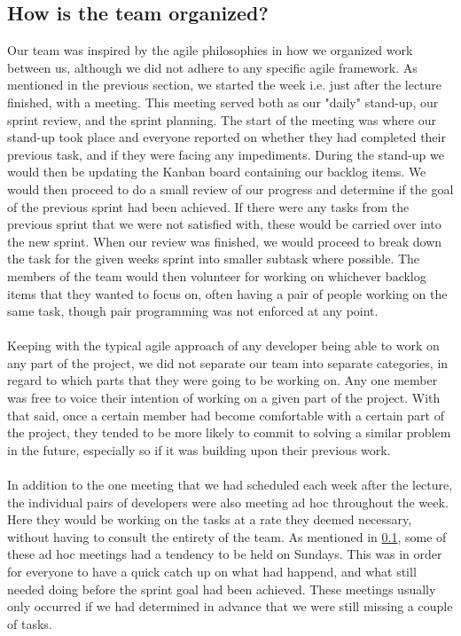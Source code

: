 \subsection{How is the team organized?} \label{Team organization}
Our team was inspired by the agile philosophies in how we organized work between us, although we did not adhere to any specific agile framework. As mentioned in the previous section, we started the week i.e. just after the lecture finished, with a meeting. This meeting served both as our "daily" stand-up, our sprint review, and the sprint planning. The start of the meeting was where our stand-up took place and everyone reported on whether they had completed their previous task, and if they were facing any impediments. During the stand-up we would then be updating the Kanban board containing our backlog items. We would then proceed to do a small review of our progress and determine if the goal of the previous sprint had been achieved. If there were any tasks from the previous sprint that we were not satisfied with, these would be carried over into the new sprint. When our review was finished, we would proceed to break down the task for the given weeks sprint into smaller subtask where possible. The members of the team would then volunteer for working on whichever backlog items that they wanted to focus on, often having a pair of people working on the same task, though pair programming was not enforced at any point.
\\\\
Keeping with the typical agile approach of any developer being able to work on any part of the project, we did not separate our team into separate categories, in regard to which parts that they were going to be working on. Any one member was free to voice their intention of working on a given part of the project. With that said, once a certain member had become comfortable  with a certain part of the project, they tended to be more likely to commit to solving a similar problem in the future, especially so if it was building upon their previous work.
\\\\
In addition to the one meeting that we had scheduled each week after the lecture, the individual pairs of developers were also meeting ad hoc throughout the week. Here they would be working on the tasks at a rate they deemed necessary, without having to consult the entirety of the team. As mentioned in \ref{Team organization}, some of these ad hoc meetings had a tendency to be held on Sundays. This was in order for everyone to have a quick catch up on what had happend, and what still needed doing before the sprint goal had been achieved. These meetings usually only occurred if we had determined in advance that we were still missing a couple of tasks.

